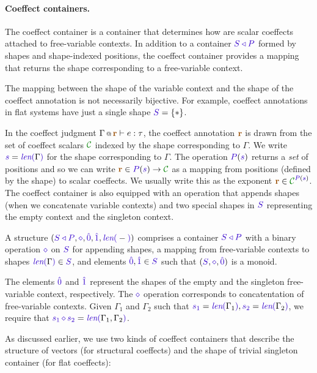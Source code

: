 \paragraph{Coeffect containers.}
The coeffect container is a container that determines how are scalar coeffects attached to 
free-variable contexts. In addition to a container $\SHP$ formed by shapes and shape-indexed positions, 
the coeffect container provides a mapping that returns the shape corresponding to a free-variable context. 

The mapping between the shape of the variable context and the shape of the coeffect annotation
is not necessarily bijective. For example, coeffect annotations in flat systems have just a single 
shape $\SH = \{ \ast \}$.

In the coeffect judgment $\coctx{\Gamma}{\aclrd{\textbf{r}}} \vdash e : \tau$, the coeffect annotation
$\aclrd{\textbf{r}}$ is drawn from the set of coeffect scalars $\C$ indexed by the shape corresponding
to $\Gamma$. We write $\sclrd{s} = \slen{\Gamma}$ for the shape corresponding to $\Gamma$. The operation 
$\SP(\sclrd{s})$ returns a \emph{set} of positions and so we can write $\aclrd{\textbf{r}} \in 
  \SP(\sclrd{s}) \rightarrow \C$  as a mapping from positions (defined by the shape) to scalar coeffects. 
We usually write this as the exponent $\aclrd{\textbf{r}} \in \C^{\SP(\sclrd{s})}$.
The coeffect container is also equipped with an operation that appends shapes (when we concatenate
variable contexts) and two special shapes in $\SH$ representing the empty context and the singleton 
context. 

\begin{definition}
A \emph{} structure $(\SHP, \stimes, \sempty, \sunit, \slen{-})$ 
comprises a container $\SHP$ with a binary operation $\stimes$ on $\SH$ for appending shapes, a 
mapping from free-variable contexts to shapes $\slen{\Gamma} \in \SH$, and elements $\sempty,\sunit \in
\SH$ such that $(\SH, \stimes, \sempty)$ is a monoid.

The elements $\sempty$ and $\sunit$ represent the shapes of the empty and the singleton free-variable 
context, respectively. The $\stimes$ operation corresponds to concatentation of free-variable contexts.
Given $\Gamma_1$ and $\Gamma_2$ such that $\sclrd{s_1}=\slen{\Gamma_1}, \sclrd{s_2}=\slen{\Gamma_2}$, 
we require that $\sclrd{s_1}\,\stimes\,\sclrd{s_2}=\slen{\Gamma_1, \Gamma_2}$. 
\end{definition}

\noindent
As discussed earlier, we use two kinds of coeffect containers that describe the structure of vectors 
(for structural coeffects) and the shape of trivial singleton container (for flat coeffects): 

